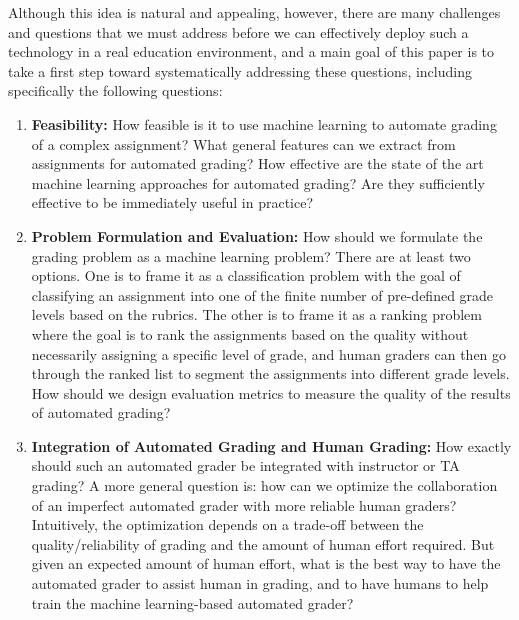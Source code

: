 Although this idea is natural and appealing, however, there are many challenges and
questions that we must address before we can effectively deploy such a
technology in a real education environment, and a main goal of this paper
is to take a first step toward systematically addressing these questions,
including specifically the following questions:

\begin{enumerate}
\item {\bf Feasibility:} How feasible is it to use machine learning to automate grading of a complex assignment? 
What general features can we extract from assignments for automated
 grading? How effective are the state of the art machine learning approaches
 for automated grading? Are they sufficiently effective to be immediately
 useful in practice?

\item {\bf Problem Formulation and Evaluation:}  How should we formulate the grading problem as a machine learning
 problem? There are at least two options. One is to frame it as a
 classification problem with the goal of classifying an assignment into one
 of the finite number of pre-defined grade levels based on the rubrics. The
 other is to frame it as a ranking problem where the goal is to rank the
 assignments based on the quality without necessarily assigning a specific
 level of grade, and human graders can then go through the ranked list to
 segment the assignments into different grade levels. How should we design evaluation metrics
to measure the quality of the results of automated grading? 

\item {\bf Integration of Automated Grading and Human Grading:} How exactly should such an automated grader be integrated with
 instructor or TA grading? A more general question is: how can we optimize
 the collaboration of an imperfect automated grader with more reliable
 human graders? Intuitively, the optimization depends on a trade-off between
 the quality/reliability of grading and the amount of human effort
 required. But given an expected amount of human effort, what is the best
 way to have the automated grader to assist human in grading, and to have
 humans to help train the machine learning-based automated grader?

\end{enumerate}

